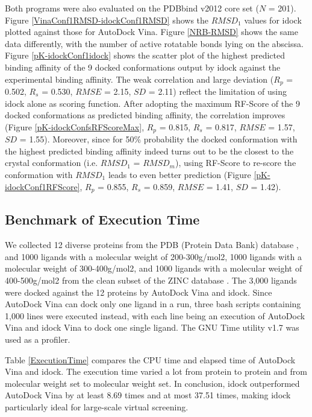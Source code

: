 \documentclass[10pt]{article}
\begin{document}
Both programs were also evaluated on the PDBbind v2012 core set ($N$ = 201). Figure \ref{VinaConf1RMSD-idockConf1RMSD} shows the $RMSD_1$ values for idock plotted against those for AutoDock Vina. Figure \ref{NRB-RMSD} shows the same data differently, with the number of active rotatable bonds lying on the abscissa. Figure \ref{pK-idockConf1idock} shows the scatter plot of the highest predicted binding affinity of the 9 docked conformations output by idock against the experimental binding affinity. The weak correlation and large deviation ($R_p$ = 0.502, $R_s$ = 0.530, $RMSE$ = 2.15, $SD$ = 2.11) reflect the limitation of using idock alone as scoring function. After adopting the maximum RF-Score of the 9 docked conformations as predicted binding affinity, the correlation improves (Figure \ref{pK-idockConfsRFScoreMax}, $R_p$ = 0.815, $R_s$ = 0.817, $RMSE$ = 1.57, $SD$ = 1.55). Moreover, since for 50\% probability the docked conformation with the highest predicted binding affinity indeed turns out to be the closest to the crystal conformation (i.e. $RMSD_1$ = $RMSD_m$), using RF-Score to re-score the conformation with $RMSD_1$ leads to even better prediction (Figure \ref{pK-idockConf1RFScore}, $R_p$ = 0.855, $R_s$ = 0.859, $RMSE$ = 1.41, $SD$ = 1.42).

\subsection*{Benchmark of Execution Time}
We collected 12 diverse proteins from the PDB (Protein Data Bank) database \cite{540,537}, and 1000 ligands with a molecular weight of 200-300g/mol2, 1000 ligands with a molecular weight of 300-400g/mol2, and 1000 ligands with a molecular weight of 400-500g/mol2 from the clean subset of the ZINC database \cite{532,1178}. The 3,000 ligands were docked against the 12 proteins by AutoDock Vina and idock. Since AutoDock Vina can dock only one ligand in a run, three bash scripts containing 1,000 lines were executed instead, with each line being an execution of AutoDock Vina and idock Vina to dock one single ligand. The GNU Time utility v1.7 was used as a profiler.

Table \ref{ExecutionTime} compares the CPU time and elapsed time of AutoDock Vina and idock. The execution time varied a lot from protein to protein and from molecular weight set to molecular weight set. In conclusion, idock outperformed AutoDock Vina by at least 8.69 times and at most 37.51 times, making idock particularly ideal for large-scale virtual screening.
\end{document}
